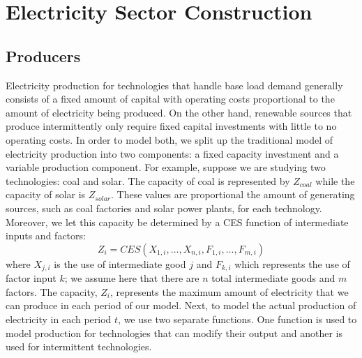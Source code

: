 \documentclass[12pt,a4paper]{extarticle}
\begin{document}
	
%	
%	
%	
%	

\section{Electricity Sector Construction}

\subsection{Producers}

Electricity production for technologies that handle base load demand generally consists of a fixed amount of capital with operating costs proportional to the amount of electricity being produced. On the other hand, renewable sources that produce intermittently only require fixed capital investments with little to no operating costs. In order to model both, we split up the traditional model of electricity production into two components: a fixed capacity investment and a variable production component. For example, suppose we are studying two technologies: coal and solar. The capacity of coal is represented by  $Z_{coal}$ while the capacity of solar is $Z_{solar}$. These values are proportional the amount of generating sources, such as coal factories and solar power plants, for each technology. Moreover, we let this capacity be determined by a CES function of intermediate inputs and factors:
$$ Z_{i} =  CES( X_{1,i}, \dots, X_{n,i}, F_{1,i}, \dots, F_{m,i})$$
where $X_{j,i}$ is the use of intermediate good $j$ and  $F_{k,i}$ which represents the use of factor input $k$; we assume here that there are $n$ total intermediate goods and $m$ factors. The capacity, $Z_{i}$, represents the maximum amount of electricity that we can produce in each period of our model.  Next, to model the actual production of electricity in each period $t$, we use two separate functions. One function is used to model production for technologies that can modify their output and another is used for intermittent technologies.
\end{document}
